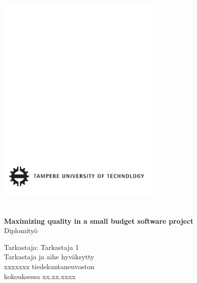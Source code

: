 ﻿\documentclass[12pt,a4paper,finnish]{tutthesis}
\begin{document}
 
\thispagestyle{empty}
 
\vspace*{-.5cm}\noindent
 
 
\includegraphics[width=8cm]{tut-logo}
 
\vspace{6.8cm}
 
\\
{\bf\large \textsf{Maximizing quality in a small budget software project}}\\
\textsf{Diplomityö}
 
\vspace{8.7cm} %
 
\begin{flushright}
  
\begin{minipage}[c]{6.8cm}
\begin{spacing}{1.0}
\textsf{Tarkastaja: Tarkastaja 1}\\
\textsf{Tarkastaja ja aihe hyväksytty}\\ 
\textsf{xxxxxxx tiedekuntaneuvoston}\\
\textsf{kokouksessa xx.xx.xxxx}\\
\end{spacing}
\end{minipage}
\end{flushright}
 
\newpage
 
\end{document}

